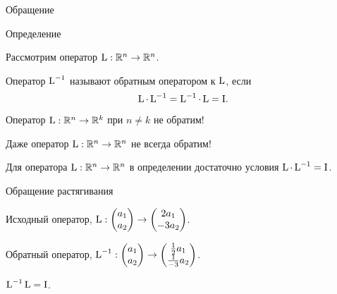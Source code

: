 

\begin{frame} %


\end{frame}
  

\begin{frame}{Обращение}




\begin{block}{Определение}

Рассмотрим оператор $\operatorname{L} : \mathbb{R}^n \to \mathbb{R}^n$. 

Оператор $\operatorname{L}^{-1}$ называют \alert{обратным оператором} к $\operatorname{L}$, если 
\[
\operatorname{L} \cdot \operatorname{L}^{-1} = \operatorname{L}^{-1} \cdot  \operatorname{L} = \mathrm{I}.
\]
\end{block}

\pause

Оператор $\operatorname{L}: \mathbb{R}^n \to \mathbb{R}^k$ при $n \neq k$ не обратим!

\pause

Даже оператор $\operatorname{L}: \mathbb{R}^n \to \mathbb{R}^n$ не всегда обратим!

\pause

Для оператора $\operatorname{L}: \mathbb{R}^n \to \mathbb{R}^n$ в определении достаточно условия $\operatorname{L} \cdot \operatorname{L}^{-1} = \mathrm{I}$.


\end{frame}


\begin{frame}{Обращение растягивания}


Исходный оператор, $\operatorname{L} : \begin{pmatrix}
  a_1 \\
  a_2 \\
\end{pmatrix} \to
\begin{pmatrix}
  2a_1 \\
  -3a_2 \\
\end{pmatrix}
$.
\pause

Обратный оператор,  
$\operatorname{L}^{-1} : \begin{pmatrix}
    a_1 \\
    a_2 \\
  \end{pmatrix} \to
  \begin{pmatrix}
    \frac{1}{2}a_1 \\
    \frac{1}{-3}a_2 \\
  \end{pmatrix}
  $.

\pause
$\operatorname{L}^{-1} \operatorname{L} = \mathrm{I}$.


\end{frame}
    


